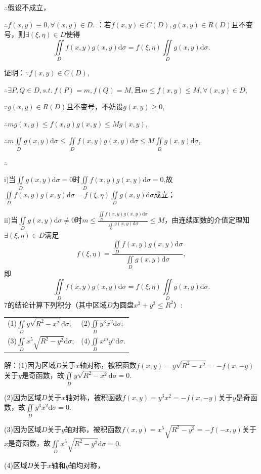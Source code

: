 \documentclass[12pt,UTF8]{ctexart}
\newcommand{\aIInt}[1]{\iint\limits_{#1}}
\begin{document}
\begin{enumerate}
$\therefore$假设不成立，

$\therefore f(x,y)\equiv0,\forall(x,y)\in D$.
：若$f(x,y)\in C(D),g(x,y)\in R(D)$且不变号，则$\exists(\xi,\eta)\in D$使得
\[
\aIInt{D}f(x,y)g(x,y)\mathrm d\sigma=f(\xi,\eta)\aIInt{D}g(x,y)\mathrm d\sigma.
\]

证明：$\because f(x,y)\in C(D)$,

$\therefore\exists P,Q\in D,s.t.\ f(P)=m,f(Q)=M,\text{且}m\leqslant f(x,y)\leqslant M,\forall (x,y)\in D$,

$\because g(x,y)\in R(D)$且不变号，不妨设$g(x,y)\geqslant 0$,

$\therefore mg(x,y)\leqslant f(x,y)g(x,y)\leqslant Mg(x,y)$,

$\therefore m\aIInt{D}g(x,y)\mathrm d\sigma\leqslant\aIInt{D}f(x,y)g(x,y)\mathrm d\sigma\leqslant M\aIInt{D}g(x,y)\mathrm d\sigma$,

$\therefore$

i)当$\aIInt{D}g(x,y)\mathrm d\sigma=0$时$\aIInt{D}f(x,y)g(x,y)\mathrm d\sigma=0$,故$\aIInt{D}f(x,y)g(x,y)\mathrm d\sigma=f(\xi,\eta)\aIInt{D}g(x,y)\mathrm d\sigma$成立；

ii)当$\aIInt{D}g(x,y)\mathrm d\sigma\neq0$时$m\leqslant\frac{\aIInt{D}f(x,y)g(x,y)\mathrm d\sigma}{\aIInt{D}g(x,y)\mathrm d\sigma}\leqslant M$，由连续函数的介值定理知$\exists(\xi,\eta)\in D$满足
\[f(\xi,\eta)=\frac{\aIInt{D}f(x,y)g(x,y)\mathrm d\sigma}{\aIInt{D}g(x,y)\mathrm d\sigma},\]
即
\[\aIInt{D}f(x,y)g(x,y)\mathrm d\sigma=f(\xi,\eta)\aIInt{D}g(x,y)\mathrm d\sigma.\]
7的结论计算下列积分（其中区域$D$为圆盘$x^2+y^2\leqslant R^2$）:\\
\begin{tabular}{ll}
(1)$\aIInt{D}y\sqrt{R^2-x^2}\mathrm d\sigma$;&(2)$\aIInt{D}y^3x^2\mathrm d\sigma$;\\
(3)$\aIInt{D}x^5\sqrt{R^2-y^2}\mathrm d\sigma$;&(4)$\aIInt{D}x^my^n\mathrm d\sigma$.
\end{tabular}

解：(1)因为区域$D$关于$x$轴对称，被积函数$f(x,y)=y\sqrt{R^2-x^2}=-f(x,-y)$关于$y$是奇函数，故$\aIInt{D}y\sqrt{R^2-x^2}\mathrm d\sigma=0$.

(2)因为区域$D$关于$x$轴对称，被积函数$f(x,y)=y^3x^2=-f(x,-y)$关于$y$是奇函数，故$\aIInt{D}y^3x^2\mathrm d\sigma=0$.

(3)因为区域$D$关于$y$轴对称，被积函数$f(x,y)=x^5\sqrt{R^2-y^2}=-f(-x,y)$关于$x$是奇函数，故$\aIInt{D}x^5\sqrt{R^2-y^2}\mathrm d\sigma=0$.

(4)区域$D$关于$x$轴和$y$轴均对称，


\end{enumerate}
\end{document}
